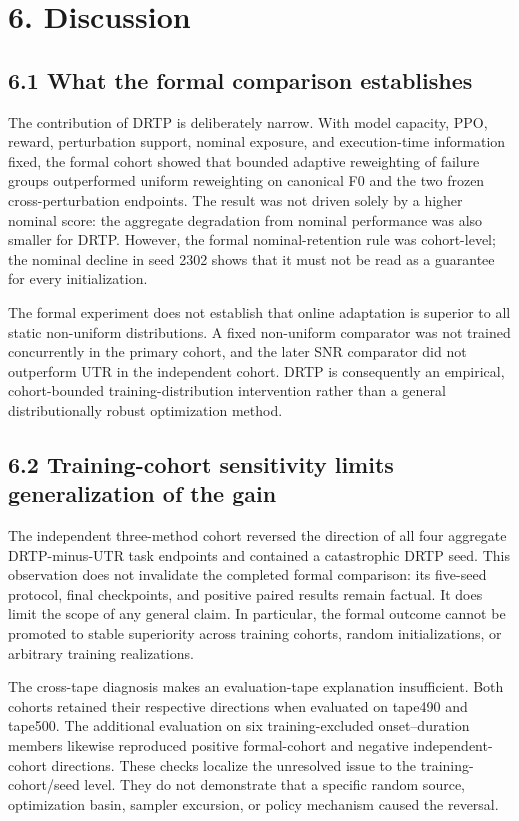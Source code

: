 \section{6. Discussion}

\subsection{6.1 What the formal comparison establishes}

The contribution of DRTP is deliberately narrow. With model capacity, PPO, reward, perturbation support, nominal exposure, and execution-time information fixed, the formal cohort showed that bounded adaptive reweighting of failure groups outperformed uniform reweighting on canonical F0 and the two frozen cross-perturbation endpoints. The result was not driven solely by a higher nominal score: the aggregate degradation from nominal performance was also smaller for DRTP. However, the formal nominal-retention rule was cohort-level; the nominal decline in seed 2302 shows that it must not be read as a guarantee for every initialization.

The formal experiment does not establish that online adaptation is superior to all static non-uniform distributions. A fixed non-uniform comparator was not trained concurrently in the primary cohort, and the later SNR comparator did not outperform UTR in the independent cohort. DRTP is consequently an empirical, cohort-bounded training-distribution intervention rather than a general distributionally robust optimization method.

\subsection{6.2 Training-cohort sensitivity limits generalization of the gain}

The independent three-method cohort reversed the direction of all four aggregate DRTP-minus-UTR task endpoints and contained a catastrophic DRTP seed. This observation does not invalidate the completed formal comparison: its five-seed protocol, final checkpoints, and positive paired results remain factual. It does limit the scope of any general claim. In particular, the formal outcome cannot be promoted to stable superiority across training cohorts, random initializations, or arbitrary training realizations.

The cross-tape diagnosis makes an evaluation-tape explanation insufficient. Both cohorts retained their respective directions when evaluated on tape490 and tape500. The additional evaluation on six training-excluded onset--duration members likewise reproduced positive formal-cohort and negative independent-cohort directions. These checks localize the unresolved issue to the training-cohort/seed level. They do not demonstrate that a specific random source, optimization basin, sampler excursion, or policy mechanism caused the reversal.

